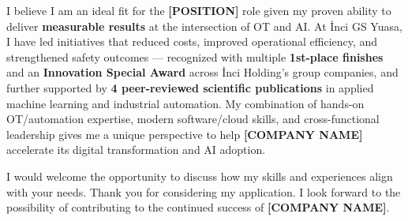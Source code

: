 \documentclass[11pt, a4paper]{awesome-cv}
\newcommand{\ph}[1]{\textcolor{awesome-red}{\bfseries #1}}
\begin{document}
\begin{cvletter}
I believe I am an ideal fit for the \ph{[POSITION]} role given my proven ability to deliver \textbf{measurable results} at the intersection of OT and AI. At İnci GS Yuasa, I have led initiatives that reduced costs, improved operational efficiency, and strengthened safety outcomes --- recognized with multiple \textbf{1st-place finishes} and an \textbf{Innovation Special Award} across İnci Holding's group companies, and further supported by \textbf{4 peer-reviewed scientific publications} in applied machine learning and industrial automation. My combination of hands-on OT/automation expertise, modern software/cloud skills, and cross-functional leadership gives me a unique perspective to help \ph{[COMPANY NAME]} accelerate its digital transformation and AI adoption.

I would welcome the opportunity to discuss how my skills and experiences align with your needs. Thank you for considering my application. I look forward to the possibility of contributing to the continued success of \ph{[COMPANY NAME]}.

\end{cvletter}

\makeletterclosing

\vspace{-8mm}

\vspace{6.8mm}

\end{document}

